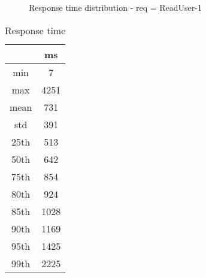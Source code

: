 \begin{minipage}{0.75\linewidth}
\begin{figure}[h]
\begin{adjustbox}{max width=1.0\linewidth, keepaspectratio}
  \end{adjustbox}
  \caption{Response time distribution - req = ReadUser-1}
\end{figure}
\end{minipage}\hfill\begin{minipage}{0.18\linewidth}
\begin{table}[h]
\begin{tabular}{|cc|}
\hline
\textbf{} & \textbf{ms}\\ \hline
 \Xhline{0.005\arrayrulewidth}
min & 7\\
 \Xhline{0.005\arrayrulewidth}
max & 4251\\
 \Xhline{0.005\arrayrulewidth}
mean & 731\\
 \Xhline{0.005\arrayrulewidth}
std & 391\\
\hline
\hline
 \Xhline{0.005\arrayrulewidth}
25th & 513\\
 \Xhline{0.005\arrayrulewidth}
50th & 642\\
 \Xhline{0.005\arrayrulewidth}
75th & 854\\
 \Xhline{0.005\arrayrulewidth}
80th & 924\\
 \Xhline{0.005\arrayrulewidth}
85th & 1028\\
 \Xhline{0.005\arrayrulewidth}
90th & 1169\\
 \Xhline{0.005\arrayrulewidth}
95th & 1425\\
 \Xhline{0.005\arrayrulewidth}
99th & 2225\\
\hline
\end{tabular}
\caption{Response time}
\end{table}
\end{minipage}\hfill